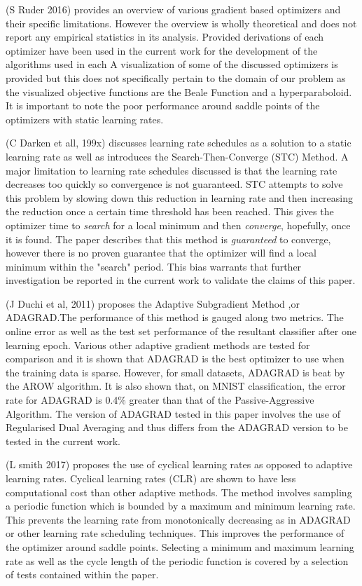 \documentclass{article}
\begin{document}
(S Ruder 2016) provides an overview of various gradient based optimizers and their specific limitations. However the overview is wholly theoretical and does not report any empirical statistics in its analysis.
Provided derivations of each optimizer have been used in the current work for the development of the algorithms used in each  A visualization of some of the discussed optimizers is provided but this does not specifically pertain to the domain of our problem as the visualized objective functions are the Beale Function and a hyperparaboloid. It is important to note the poor performance around saddle points of the optimizers with static learning rates.

(C Darken et all, 199x) discusses learning rate schedules as a solution to a static learning rate as well as introduces the Search-Then-Converge (STC) Method. A major limitation to learning rate schedules discussed is that the learning rate decreases too quickly so convergence is not guaranteed. STC attempts to solve this problem by slowing down this reduction in learning rate and then increasing the reduction once a certain time threshold has been reached. This gives the optimizer time to \textit{search} for a local minimum and then \textit{converge}, hopefully, once it is found. The paper describes that this method is \textit{guaranteed} to converge, however there is no proven guarantee that the optimizer will find a local minimum within the "search" period. This bias warrants that further investigation be reported in the current work to validate the claims of this paper.

(J Duchi et al, 2011) proposes the Adaptive Subgradient Method ,or ADAGRAD.The performance of this method is gauged along two metrics. The online error as well as the test set performance of the resultant classifier after one learning epoch. Various other adaptive gradient methods are tested for comparison and it is shown that ADAGRAD is the best optimizer to use when the training data is sparse. However, for small datasets, ADAGRAD is beat by the AROW algorithm. It is also shown that, on MNIST classification, the error rate for ADAGRAD is 0.4\% greater than that of the Passive-Aggressive Algorithm. The version of ADAGRAD tested in this paper involves the use of Regularised Dual Averaging and thus differs from the ADAGRAD version to be tested in the current work.

(L smith 2017) proposes  the use of cyclical learning rates as opposed to adaptive learning rates. Cyclical learning rates (CLR) are shown to have less computational cost than other adaptive methods.
The method involves sampling a periodic function which is bounded by a maximum and minimum learning rate. This prevents the learning rate from monotonically decreasing as in ADAGRAD or other learning rate scheduling techniques. This improves the performance of the optimizer around saddle points. Selecting a minimum and maximum learning rate as well as the cycle length of the periodic function is covered by a selection of tests contained within the paper. 
\end{document}
